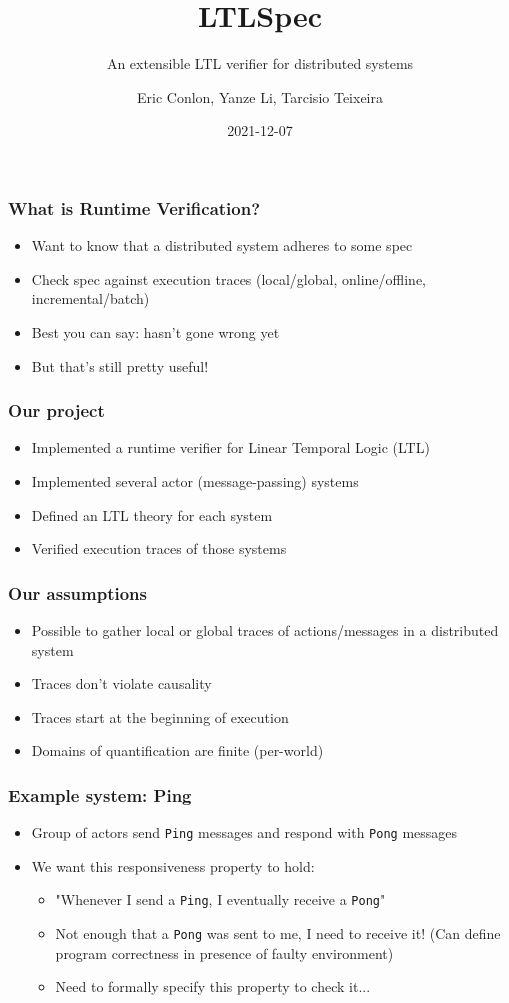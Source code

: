\documentclass[12pt,aspectratio=169]{beamer}
\title{LTLSpec}
\subtitle{An extensible LTL verifier for distributed systems}
\author{Eric Conlon, Yanze Li, Tarcisio Teixeira}
\date{2021-12-07}
\begin{document}
\frame{\titlepage}

\begin{frame}
\frametitle{What is Runtime Verification?}
\begin{itemize}
  \item Want to know that a distributed system adheres to some spec
  \item Check spec against execution traces
  \newline (local/global, online/offline, incremental/batch)
  \item Best you can say: hasn't gone wrong yet
  \item But that's still pretty useful!
\end{itemize}
\end{frame}

\begin{frame}
\frametitle{Our project}
\begin{itemize}
  \item Implemented a runtime verifier for Linear Temporal Logic (LTL)
  \item Implemented several actor (message-passing) systems
  \item Defined an LTL theory for each system
  \item Verified execution traces of those systems
\end{itemize}
\end{frame}

\begin{frame}
\frametitle{Our assumptions}
\begin{itemize}
  \item Possible to gather local or global traces of actions/messages in a distributed system
  \item Traces don't violate causality
  \item Traces start at the beginning of execution
  \item Domains of quantification are finite (per-world)
\end{itemize}
\end{frame}

\begin{frame}
\frametitle{Example system: Ping}
\begin{itemize}
  \item Group of actors send \texttt{Ping} messages and respond with \texttt{Pong} messages
  \item We want this responsiveness property to hold:
  \begin{itemize}
    \item "Whenever I send a \texttt{Ping}, I eventually receive a \texttt{Pong}"
    \item Not enough that a \texttt{Pong} was sent to me, I need to receive it!
    \newline (Can define program correctness in presence of faulty environment)
    \item Need to formally specify this property to check it...
  \end{itemize}
\end{itemize}
\end{frame}
\end{document}
